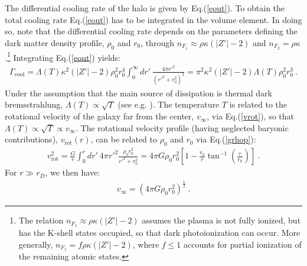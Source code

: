 \documentclass[12pt]{article}
\begin{document}
{{The differential cooling rate of the halo is given by Eq.(\ref{eout}).
To obtain the total cooling rate Eq.(\ref{eout}) has to be integrated in
the volume element. In doing so, note that the differential cooling rate
depends on the parameters defining the dark matter density profile,
$\rho _0$ and $r _0$, through $n _{F _1} \approx \rho \kappa (|Z'|-2)$
and $n _{F_2} = \rho \kappa$.\footnote{The relation $n _{F_1} \approx
\rho \kappa (|Z'|-2)$ assumes the plasma is not fully ionized, but has
the K-shell states occupied, so that dark photoionization can occur.
More generally, $n _{F_1} = f\rho \kappa (|Z'|-2)$, where $f \leq 1$
accounts for partial ionization of the remaining atomic states.}
Integrating Eq.(\ref{eout}) yields:
%
\begin{eqnarray}
\Gamma _{\text{cool}} = \Lambda (T)\kappa ^2 (|Z'|-2)\rho _0 ^2r _0
^4\int _0 ^{\infty} dr' \ \frac{4\pi {r'} ^2}{({r'} ^2 + r _0 ^2) ^2} =
\pi ^2\kappa ^2(|Z'|-2)\Lambda (T)\rho _0 ^2r _0 ^3 \ .
\label{tullyfishereout}
\end{eqnarray}
%
Under the assumption that the main source of dissipation is thermal dark
bremsstrahlung, $\Lambda (T) \propto \sqrt{T}$ (see e.g.
\cite{radiative}). The temperature $T$ is related to the rotational
velocity of the galaxy far from the center, $v _{\infty}$, via
Eq.(\ref{vrot}), so that $\Lambda (T) \propto \sqrt{T} \propto v
_{\infty}$. The rotational velocity profile (having neglected baryonic
contributions), $v _{\text{rot}}(r)$, can be related to $\rho _0$ and $r
_0$ via Eq.(\ref{grhop}):
%
\begin{eqnarray}
v _{\text{rot}} ^2 = \frac{G}{r} \int _0 ^r dr' \ 4\pi {r'} ^2
\frac{\rho _0r _0 ^2}{{r'} ^2 + r _0 ^2} = 4\pi G\rho _0 r _0 ^2 \left
[1 - \frac{r _0}{r}\tan ^{-1} \left ( \frac{r}{r _0} \right ) \right ] \
.
\label{vrot1}
\end{eqnarray}
%
For $r \gg r _D$, we then have:
%
\begin{eqnarray}
v _{\infty} = \left (4\pi G\rho _0r _0 ^2 \right) ^{\frac{1}{2}} \ .
\label{vrot2}
\end{eqnarray}
% 

}}
\end{document}
